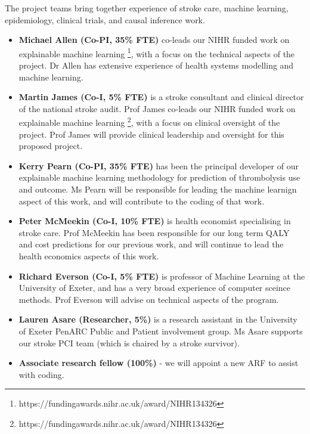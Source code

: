 The project teams bring together experience of stroke care, machine learning, epidemiology, clinical trials, and causal inference work.

\begin{itemize}

    \item \textbf{Michael Allen (Co-PI, 35\% FTE)} co-leads our NIHR funded work on explainable machine learning \footnote{https://fundingawards.nihr.ac.uk/award/NIHR134326}, with a focus on the technical aspects of the project. Dr Allen has extensive experience of health systems modelling and machine learning.

    \item \textbf{Martin James (Co-I, 5\% FTE)} is a stroke consultant and clinical director of the national stroke audit. Prof James co-leads our NIHR funded work on explainable machine learning \footnote{https://fundingawards.nihr.ac.uk/award/NIHR134326}, with a focus on clinical oversight of the project. Prof James will provide clinical leadership and oversight for this proposed project.

    \item \textbf{Kerry Pearn (Co-PI, 35\% FTE)} has been the principal developer of our explainable machine learning methodology for prediction of thrombolysis use and outcome. Ms Pearn will be responsible for leading the machine learnign aspect of this work, and will contribute to the coding of that work.

    \item \textbf{Peter McMeekin (Co-I, 10\% FTE)} is health economist specialising in stroke care. Prof McMeekin has been responsible for our long term QALY and cost predictions for our previous work, and will continue to lead the health economics aspects of this work.

    \item \textbf{Richard Everson (Co-I, 5\% FTE)} is professor of Machine Learning at the University of Exeter, and has a very broad experience of computer sceince methods. Prof Everson will advise on technical aspects of the program.

    \item \textbf{Lauren Asare (Researcher, 5\%)} is a research assistant in the University of Exeter PenARC Public and Patient involvement group. Ms Asare supports our stroke PCI team (which is chaired by a stroke survivor).

    \item \textbf{{Associate research fellow (100\%)}} - we will appoint a new ARF to assist with coding.

\end{itemize}

